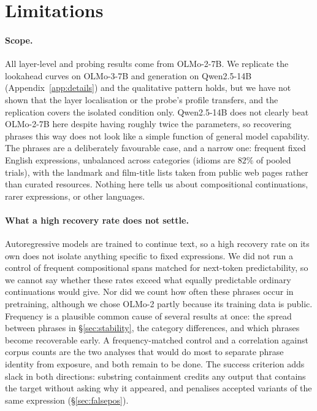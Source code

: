 \section*{Limitations}
\label{sec:limitations}

\paragraph{Scope.}
All layer-level and probing results come from OLMo-2-7B. We replicate the
lookahead curves on OLMo-3-7B and generation on Qwen2.5-14B
(Appendix~\ref{app:details}) and the qualitative pattern holds, but we have not
shown that the layer localisation or the probe's profile transfers, and the
replication covers the isolated condition only. Qwen2.5-14B does not clearly beat OLMo-2-7B here despite having roughly twice
the parameters, so recovering phrases this way does not look like a simple
function of general model capability. The phrases are a
deliberately favourable case, and a narrow one: frequent fixed English
expressions, unbalanced across categories (idioms are $82\%$ of pooled trials),
with the landmark and film-title lists taken from public web pages rather than
curated resources. Nothing here tells us about compositional continuations, rarer expressions, or
other languages.

\paragraph{What a high recovery rate does not settle.}
Autoregressive models are trained to continue text, so a high recovery rate on
its own does not isolate anything specific to fixed expressions. We did not run
a control of frequent compositional spans matched for next-token predictability,
so we cannot say whether these rates exceed what equally predictable ordinary
continuations would give. Nor did we count how often these phrases occur in
pretraining, although we chose OLMo-2 partly because its training data is
public. Frequency is a plausible common cause of several results at once: the
spread between phrases in \S\ref{sec:stability}, the category differences, and
which phrases become recoverable early. A frequency-matched control and a
correlation against corpus counts are the two analyses that would do most to
separate phrase identity from exposure, and both remain to be done. The success
criterion adds slack in both directions: substring containment credits any
output that contains the target without asking why it appeared, and penalises
accepted variants of the same expression (\S\ref{sec:falsepos}).

